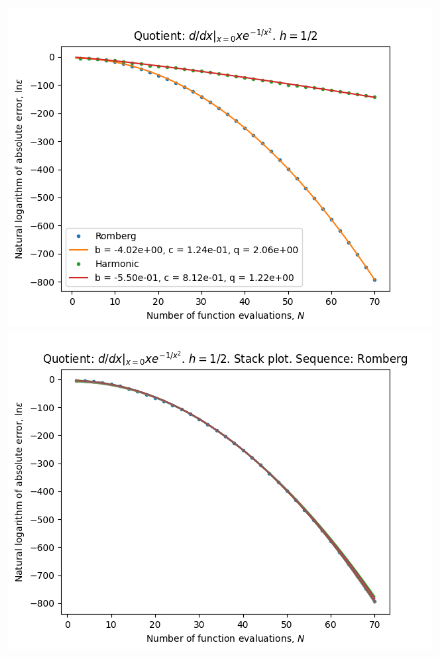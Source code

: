 \begin{figure}[H]
\centering
\begin{minipage}{0.45\textwidth}
\centering
\includegraphics[scale=0.45]{../results/diff_quot_plots/xemxm2_hp_trend.png}
\end{minipage}
\begin{minipage}{0.45\textwidth}
\centering
\includegraphics[scale=0.45]{../results/diff_quot_plots/xemxm2_hp_romberg_stack.png}
\end{minipage}
\end{figure}

